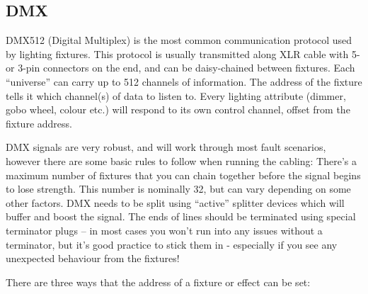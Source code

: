 \documentclass[14pt]{article} %
\begin{document}
\subsection{DMX}

DMX512 (Digital Multiplex) is the most common communication protocol used by lighting fixtures. This protocol is usually transmitted along XLR cable with 5- or 3-pin connectors on the end, and can be daisy-chained between fixtures. Each “universe” can carry up to 512 channels of information. The address of the fixture tells it which channel(s) of data to listen to. Every lighting attribute (dimmer, gobo wheel, colour etc.) will respond to its own control channel, offset from the fixture address. 

DMX signals are very robust, and will work through most fault scenarios, however there are some basic rules to follow when running the cabling: There’s a maximum number of fixtures that you can chain together before the signal begins to lose strength. This number is nominally 32, but can vary depending on some other factors. DMX needs to be split using “active” splitter devices which will buffer and boost the signal. The ends of lines should be terminated using special terminator plugs – in most cases you won’t run into any issues without a terminator, but it’s good practice to stick them in - especially if you see any unexpected behaviour from the fixtures!

There are three ways that the address of a fixture or effect can be set:
\end{document}
